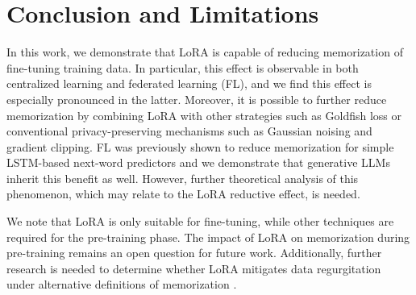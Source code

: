 \section{Conclusion and Limitations}
In this work, we demonstrate that LoRA is capable of reducing memorization of fine-tuning training data. In particular, this effect is observable in both centralized learning and federated learning (FL), and we find this effect is especially pronounced in the latter. Moreover, it is possible to further reduce memorization by combining LoRA with other strategies such as Goldfish loss or conventional privacy-preserving mechanisms such as Gaussian noising and gradient clipping. FL was previously shown to reduce memorization for simple LSTM-based next-word predictors \citep{hard2018federated, thakkar2020understanding} and we demonstrate that generative LLMs inherit this benefit as well. However, further theoretical analysis of this phenomenon, which may relate to the LoRA reductive effect, is needed. 

We note that LoRA is only suitable for fine-tuning, while other techniques are required for the pre-training phase. The impact of LoRA on memorization during pre-training remains an open question for future work. Additionally, further research is needed to determine whether LoRA mitigates data regurgitation under alternative definitions of memorization \citep{schwarzschild2024rethinking}.